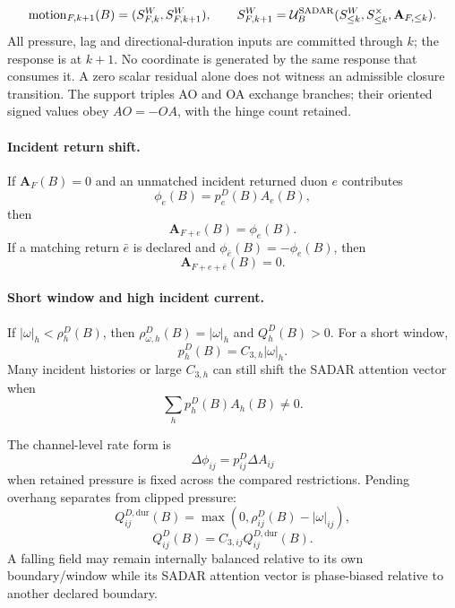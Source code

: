 \begin{equation}
\operatorname{motion}_{F,k+1}(B)=(S^W_{F,k},S^W_{F,k+1}),\qquad
S^W_{F,k+1}=\mathcal U^{\mathrm{SADAR}}_B(S^W_{\le k},S^\times_{\le k},\mathbf A_{F,\le k}).
\label{eq:causal-update}
\end{equation}
All pressure, lag and directional-duration inputs are committed through
\(k\); the response is at \(k+1\). No coordinate is generated by the same
response that consumes it. A zero scalar residual alone does not witness
an admissible closure transition. 
The support triples AO and OA exchange branches; their
oriented signed values obey \(AO=-OA\), with the hinge count retained.\label{eq:ao-oa-oriented-value}

\paragraph{Incident return shift.}
If \(\mathbf A_F(B)=0\) and an unmatched incident returned duon \(e\) contributes
\[
\phi_e(B)=p^D_e(B)A_e(B),
\]
then
\begin{equation}
\mathbf A_{F+e}(B)=\phi_e(B).
\label{eq:incident-return-shift}
\end{equation}
If a matching return \(\bar e\) is declared and \(\phi_{\bar e}(B)=-\phi_e(B)\), then
\begin{equation}
\mathbf A_{F+e+\bar e}(B)=0.
\label{eq:matched-return-cancellation}
\end{equation}

\paragraph{Short window and high incident current.}
If \(|\omega|_h<\rho^D_h(B)\), then \(\rho^D_{\omega,h}(B)=|\omega|_h\) and \(Q^D_h(B)>0\). For a short window,
\[
p^D_h(B)=C_{3,h}|\omega|_h.
\]
Many incident histories or large \(C_{3,h}\) can still shift the SADAR attention vector when
\[
\sum_h p^D_h(B)A_h(B)\ne0.
\]

The channel-level rate form is
\[
\Delta\phi_{ij}=p^D_{ij}\Delta A_{ij}
\]
when retained pressure is fixed across the compared restrictions. Pending overhang separates from clipped pressure:
\begin{equation}
Q^{D,\mathrm{dur}}_{ij}(B)=\max\!\left(0,\rho^D_{ij}(B)-|\omega|_{ij}\right),
\label{eq:duration-overhang}
\end{equation}
\begin{equation}
Q^D_{ij}(B)=C_{3,ij}Q^{D,\mathrm{dur}}_{ij}(B).
\label{eq:burden-overhang}
\end{equation}
A falling field may remain internally balanced relative to its own boundary/window while its SADAR attention vector is phase-biased relative to another declared boundary.

